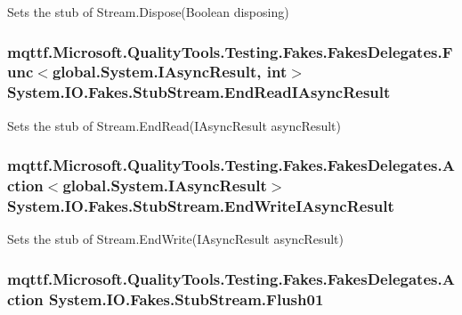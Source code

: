 Sets the stub of Stream.\-Dispose(\-Boolean disposing)

\hypertarget{class_system_1_1_i_o_1_1_fakes_1_1_stub_stream_a5564e380fa43efd38f0b41befeba6d7b}{
\subsubsection[{End\-Read\-I\-Async\-Result}]{\setlength{\rightskip}{0pt plus 5cm}mqttf.\-Microsoft.\-Quality\-Tools.\-Testing.\-Fakes.\-Fakes\-Delegates.\-Func$<$global.\-System.\-I\-Async\-Result, int$>$ System.\-I\-O.\-Fakes.\-Stub\-Stream.\-End\-Read\-I\-Async\-Result}}\label{class_system_1_1_i_o_1_1_fakes_1_1_stub_stream_a5564e380fa43efd38f0b41befeba6d7b}


Sets the stub of Stream.\-End\-Read(\-I\-Async\-Result async\-Result)

\hypertarget{class_system_1_1_i_o_1_1_fakes_1_1_stub_stream_a57991c305d485e016cc3a547c81b2775}{
\subsubsection[{End\-Write\-I\-Async\-Result}]{\setlength{\rightskip}{0pt plus 5cm}mqttf.\-Microsoft.\-Quality\-Tools.\-Testing.\-Fakes.\-Fakes\-Delegates.\-Action$<$global.\-System.\-I\-Async\-Result$>$ System.\-I\-O.\-Fakes.\-Stub\-Stream.\-End\-Write\-I\-Async\-Result}}\label{class_system_1_1_i_o_1_1_fakes_1_1_stub_stream_a57991c305d485e016cc3a547c81b2775}


Sets the stub of Stream.\-End\-Write(\-I\-Async\-Result async\-Result)

\hypertarget{class_system_1_1_i_o_1_1_fakes_1_1_stub_stream_a7fcac742b83b05203647c3b6de9a7c6a}{
\subsubsection[{Flush01}]{\setlength{\rightskip}{0pt plus 5cm}mqttf.\-Microsoft.\-Quality\-Tools.\-Testing.\-Fakes.\-Fakes\-Delegates.\-Action System.\-I\-O.\-Fakes.\-Stub\-Stream.\-Flush01}}\label{class_system_1_1_i_o_1_1_fakes_1_1_stub_stream_a7fcac742b83b05203647c3b6de9a7c6a}



